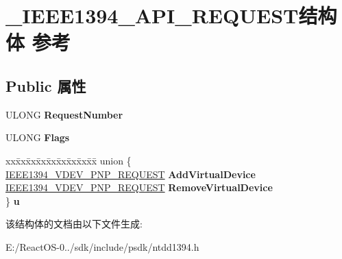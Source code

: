 \hypertarget{struct___i_e_e_e1394___a_p_i___r_e_q_u_e_s_t}{}\section{\+\_\+\+I\+E\+E\+E1394\+\_\+\+A\+P\+I\+\_\+\+R\+E\+Q\+U\+E\+S\+T结构体 参考}
\label{struct___i_e_e_e1394___a_p_i___r_e_q_u_e_s_t}
\subsection*{Public 属性}
\begin{DoxyCompactItemize}
\item 
\mbox{\label{struct___i_e_e_e1394___a_p_i___r_e_q_u_e_s_t_a5030e65bb0d76d26f4aa8bfc05497661}} 
U\+L\+O\+NG {\bfseries Request\+Number}
\item 
\mbox{\label{struct___i_e_e_e1394___a_p_i___r_e_q_u_e_s_t_aa8c9785d35e8f06f325439679ff312c9}} 
U\+L\+O\+NG {\bfseries Flags}
\item 
\mbox{\label{struct___i_e_e_e1394___a_p_i___r_e_q_u_e_s_t_a7966c0424821e31199ec5133679e3cf4}} 
\begin{tabbing}
xx\=xx\=xx\=xx\=xx\=xx\=xx\=xx\=xx\=\kill
union \{\\
\>\hyperlink{struct___i_e_e_e1394___v_d_e_v___p_n_p___r_e_q_u_e_s_t}{IEEE1394\_VDEV\_PNP\_REQUEST} {\bfseries AddVirtualDevice}\\
\>\hyperlink{struct___i_e_e_e1394___v_d_e_v___p_n_p___r_e_q_u_e_s_t}{IEEE1394\_VDEV\_PNP\_REQUEST} {\bfseries RemoveVirtualDevice}\\
\} {\bfseries u}\\

\end{tabbing}\end{DoxyCompactItemize}


该结构体的文档由以下文件生成\+:\begin{DoxyCompactItemize}
\item 
E\+:/\+React\+O\+S-\/0../sdk/include/psdk/ntdd1394.\+h\end{DoxyCompactItemize}
